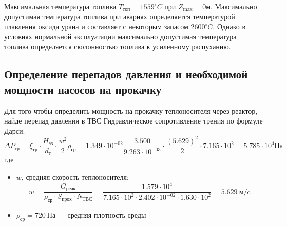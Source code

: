 Максимальная температура топлива $T_{\text{топ}} = 1559 ^\circ C$ при $Z_{\text{max}} = 0 \text{м}$. Максимально допустимая температура топлива при авариях определяется температурой плавления оксида урана и составляет с некоторым запасом $2600 ^\circ C$. Однако в условиях нормальной эксплуатации максимально допустимая температура топлива определяется сколонностью топлива к усиленному распуханию. %

\subsection{Определение перепадов давления и необходимой мощности насосов на прокачку}
Для того чтобы определить мощность на прокачку теплоносителя через реактор, найде перепад давления в ТВС
\noindent Гидравлическое сопротивление трения по формуле Дарси:
$$
\Delta P_{\text{тр}}=\xi_{\text{тр}}\cdot\frac{H_{\text{аз}}}{d_{\text{г}}}\cdot \frac {w^2}{2}\rho_{\text{ср}}
=
1.349 \cdot 10^{ -02 } \frac {3.500 } {9.263 \cdot 10^{ -03 }} \cdot \frac {(5.629 )^2} {2} \cdot 7.165 \cdot 10^{ 2 }
=5.785 \cdot 10^{ 4 } \text{Па}
$$
где 
\begin{itemize}
\item $w$, средняя скорость теплоносителя: \begin{equation}w = \frac{G_{\text{реак}}}{\rho_{\text{ср}} \cdot S_{\text{прох}} \cdot N_{\text{ТВС}}}= \frac {1.579 \cdot 10^{ 4 }} {7.165 \cdot 10^{ 2 } \cdot 2.402 \cdot 10^{ -02 } \cdot 1.630 \cdot 10^{ 2 }} = 5.629 \ \text{м} /\text{c}\end{equation}
\item $\rho_{\text{ср}} = 720\ \text{Па}$ — средняя плотность среды
\end{itemize}

